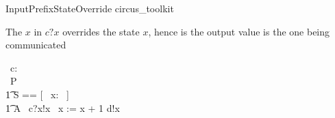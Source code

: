 \begin{zsection}
  \SECTION InputPrefixStateOverride \parents circus\_toolkit
\end{zsection}

The $x$ in $c?x$ overrides the state $x$, hence is the output value is the one
being communicated
\begin{circus}
   \circhannel\ c: \nat \cross \nat \\ 
   \circprocess\ P \circdefs\ \circbegin \\
        \t1 \circstate S == [~ x: \nat ~] \\
        \t1 A \circdefs\ c?x!x \then\ x := x + 1 \circseq d!x \then \Skip
\end{circus}
